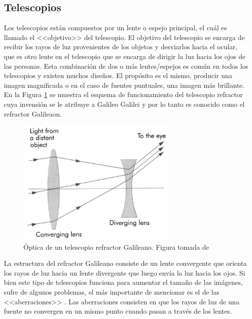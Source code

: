 \subsection{Telescopios}
Los telescopios están compuestos por un lente o espejo principal, el cuál es llamado el <<objetivo>> del telescopio. El objetivo del telescopio se encarga de recibir los rayos de luz provenientes de los objetos y desviarlos hacia el ocular, que es otro lente en el telescopio que se encarga de dirigir la luz hacia los ojos de las personas. Esta combinación de dos o más lentes/espejos es común en todos los telescopios y existen muchos diseños. El propósito es el mismo, producir una imagen magnificada o en el caso de fuentes puntuales, una imagen más brillante. En la Figura \ref{fig:galilean-refractor} se muestra el esquema de funcionamiento del telescopio refractor cuya invensión se le atribuye a Galileo Galilei y por lo tanto es conocido como el refractor Galileaon. 

\begin{figure}[htb]
  \centering
				\includegraphics[width=0.7\textwidth]{figures/galilean-refractor.png}
				\caption{Óptica de un telescopio refractor Galileano. Figura tomada de \citet{kitchin2013telescopes}}
				\label{fig:galilean-refractor} 
\end{figure}

La estructura del refractor Galileano consiste de un lente convergente que orienta los rayos de luz hacia un lente divergente que luego envía la luz hacia los ojos. Si bien este tipo de telescopios funciona para aumentar el tamaño de las imágenes, sufre de algunos problemas, el más importante de mencionar es el de las <<aberraciones>> \citep{kitchin2013telescopes}. Las aberraciones consisten en que los rayos de luz de una fuente no convergen en un mismo punto cuando pasan a través de los lentes. 

